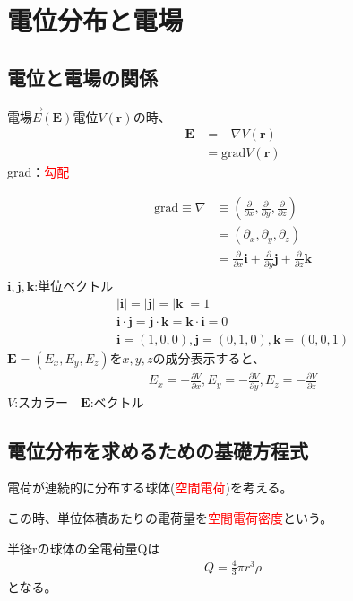\documentclass[12pt]{ltjsarticle}
\begin{document}
\newcommand{\red}[1]{\textcolor{red}{#1}}
\renewcommand{\labelenumi}{(\arabic{enumi})}
\newcommand{\grad}[0]{\mathrm{grad}}
\renewcommand{\div}[0]{\mathrm{div}}
\newcommand{\round}[2]{\frac{\partial {#1}}{\partial {#2}}}
\renewcommand{\epsilon}{\varepsilon}
\section{電位分布と電場}
\subsection{電位と電場の関係}
電場$\vec E(\bm E)$電位$V(\bm r)$の時、
\begin{align*}
\bm E&=-\nabla V(\bm r)\\
&=\grad V(\bm r)
\end{align*}
grad：\red{勾配}

\newcommand{\vi}[0]{\bm i}
\newcommand{\vj}[0]{\bm j}
\newcommand{\vk}[0]{\bm k}
\newcommand{\vE}[0]{\bm E}

\begin{align*}
\grad \equiv \nabla &\equiv
(\round{}x,\round{}y,\round{}z)\\
&=(\partial_x,\partial_y,\partial_z)\\
&=\round{}x\vi+\round{}y\vj+\round{}z\vk\\
\end{align*}
$\vi,\vj,\vk$:単位ベクトル
\begin{align*}
|\vi|=|\vj|=|\vk|=1\\
\vi\cdot\vj=\vj\cdot\vk=\vk\cdot\vi=0\\
\vi=(1,0,0),\vj=(0,1,0),\vk=(0,0,1)
\end{align*}
$\bm E=(E_x,E_y,E_z)$を$x,y,z$の成分表示すると、
\begin{align*}
E_x=-\round Vx,E_y=-\round Vy,E_z=-\round Vz
\end{align*}
$V$:スカラー　$\vE$:ベクトル

\subsection{電位分布を求めるための基礎方程式}
電荷が連続的に分布する球体(\red{空間電荷})を考える。

この時、単位体積あたりの電荷量\rho[C/m^3]を\red{空間電荷密度}という。

半径rの球体の全電荷量Qは
\begin{align*}
Q=\frac43\pi r^3\rho
\end{align*}
となる。
\end{document}
